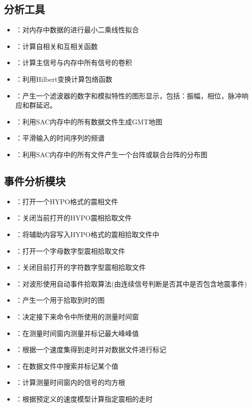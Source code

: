 \subsection*{分析工具}
\begin{itemize}
\item {}：对内存中数据的进行最小二乘线性拟合
\item {}：计算自相关和互相关函数
\item {}：计算主信号与内存中所有信号的卷积
\item {}：利用Hilbert变换计算包络函数
\item {}：产生一个滤波器的数字和模拟特性的图形显示，包括：振幅，相位，脉冲响应和群延迟。
\item {}：利用SAC内存中的所有数据文件生成GMT地图
\item {}：平滑输入的时间序列的频谱
\item {}：利用SAC内存中的所有文件产生一个台阵或联合台阵的分布图
\end{itemize}

\subsection*{事件分析模块}
\begin{itemize}
\item {}：打开一个HYPO格式的震相文件
\item {}：关闭当前打开的HYPO震相拾取文件
\item {}：将辅助内容写入HYPO格式的震相拾取文件中
\item {}：打开一个字母数字型震相拾取文件
\item {}：关闭目前打开的字符数字型震相拾取文件
\item {}：对波形使用自动事件拾取算法(由连续信号判断是否其中是否包含地震事件)
\item {}：产生一个用于拾取到时的图
\item {}：决定接下来命令中所使用的测量时间窗
\item {}：在测量时间窗内测量并标记最大峰峰值
\item {}：根据一个速度集得到走时并对数据文件进行标记
\item {}：在数据文件中搜索并标记某个值
\item {}：计算测量时间窗内的信号的均方根
\item {}：根据预定义的速度模型计算指定震相的走时
\end{itemize}

